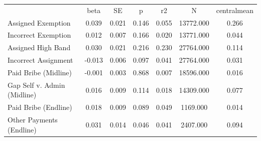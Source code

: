 {\def\sym#1{\ifmmode^{#1}\else\(^{#1}\)\fi} \begin{tabular}{l*{6}{c}} \hline\hline 
& beta & SE & p & r2 & N & centralmean \\
Assigned Exemption & 0.039 & 0.021 & 0.146 & 0.055 & 13772.000 & 0.266 \\
Incorrect Exemption & 0.012 & 0.007 & 0.166 & 0.020 & 13771.000 & 0.044 \\
Assigned High Band & 0.030 & 0.021 & 0.216 & 0.230 & 27764.000 & 0.114 \\
Incorrect Assignment & -0.013 & 0.006 & 0.097 & 0.041 & 27764.000 & 0.031 \\
Paid Bribe (Midline) & -0.001 & 0.003 & 0.868 & 0.007 & 18596.000 & 0.016 \\
Gap Self v. Admin (Midline) & 0.016 & 0.009 & 0.114 & 0.018 & 14309.000 & 0.077 \\
Paid Bribe (Endline) & 0.018 & 0.009 & 0.089 & 0.049 & 1169.000 & 0.014 \\
Other Payments (Endline) & 0.031 & 0.014 & 0.046 & 0.041 & 2407.000 & 0.094 \\
\hline\hline \end{tabular} }
